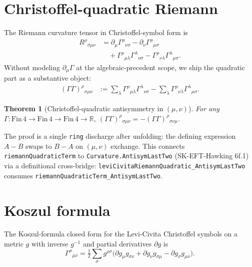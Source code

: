 \documentclass[twocolumn]{revtex4-2}
\newtheorem{theorem}{Theorem}
\newcommand{\Christoffel}{\Gamma}
\newcommand{\MetricMatrix}{g}
\newcommand{\Riem}{R}
\newcommand{\PartG}{\partial g}
\begin{document}
\section{Christoffel-quadratic Riemann}\label{sec:riemann-quad}

The Riemann curvature tensor in Christoffel-symbol form is
\begin{align}
\Riem^{\rho}{}_{\sigma\mu\nu}
  &= \partial_{\mu}\Christoffel^{\rho}{}_{\nu\sigma}
   - \partial_{\nu}\Christoffel^{\rho}{}_{\mu\sigma} \nonumber \\
  &\quad + \Christoffel^{\rho}{}_{\mu\lambda}\Christoffel^{\lambda}{}_{\nu\sigma}
   - \Christoffel^{\rho}{}_{\nu\lambda}\Christoffel^{\lambda}{}_{\mu\sigma}.
\label{eq:riem-christoffel}
\end{align}
Without modeling $\partial_{\mu}\Christoffel$ at the algebraic-precedent
scope, we ship the quadratic part as a substantive object:
\begin{align}
(\Christoffel\Christoffel)^{\rho}{}_{\sigma\mu\nu}
  &:= \sum_{\lambda} \Christoffel^{\rho}{}_{\mu\lambda}\Christoffel^{\lambda}{}_{\nu\sigma}
   - \sum_{\lambda} \Christoffel^{\rho}{}_{\nu\lambda}\Christoffel^{\lambda}{}_{\mu\sigma}.
\label{eq:gg}
\end{align}

\begin{theorem}[Christoffel-quadratic antisymmetry in $(\mu,\nu)$]\label{thm:gg-anti}
For any $\Christoffel : \mathrm{Fin}\,4 \to \mathrm{Fin}\,4 \to
\mathrm{Fin}\,4 \to \mathbb{R}$,
$(\Christoffel\Christoffel)^{\rho}{}_{\sigma\mu\nu}
  = -(\Christoffel\Christoffel)^{\rho}{}_{\sigma\nu\mu}$.
\end{theorem}

The proof is a single \texttt{ring} discharge after unfolding: the
defining expression $A - B$ swaps to $B - A$ on $(\mu,\nu)$ exchange.
This connects \texttt{riemannQuadraticTerm} to \texttt{Curvature.AntisymLastTwo}
(SK-EFT-Hawking 6f.1) via a definitional cross-bridge:
\texttt{leviCivitaRiemannQuadratic\_AntisymLastTwo} consumes
\texttt{riemannQuadraticTerm\_AntisymLastTwo}.

\section{Koszul formula}\label{sec:koszul}

The Koszul-formula closed form for the Levi-Civita Christoffel
symbols on a metric $\MetricMatrix$ with inverse $\MetricMatrix^{-1}$
and partial derivatives $\PartG$ is
\begin{equation}
\Christoffel^{\rho}{}_{\mu\nu}
  = \tfrac{1}{2}\sum_{\sigma}\MetricMatrix^{\rho\sigma}
    \bigl(\PartG_{\mu}\MetricMatrix_{\sigma\nu}
        + \PartG_{\nu}\MetricMatrix_{\sigma\mu}
        - \PartG_{\sigma}\MetricMatrix_{\mu\nu}\bigr).
\label{eq:koszul}
\end{equation}
\end{document}
